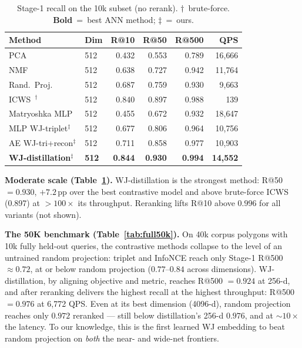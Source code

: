 \documentclass[sigconf]{acmart}
\begin{document}
\begin{table}[t]\centering
\caption{Stage-1 recall on the 10k subset (no rerank). $\dagger$~brute-force.
\textbf{Bold}~=~best ANN method; $\ddagger$~=~ours.}
\label{tab:results}\setlength{\tabcolsep}{4pt}\small
\begin{tabular}{@{}llrrrr@{}}
\toprule
Method & Dim & R@10 & R@50 & R@500 & QPS \\
\midrule
PCA~\cite{jolliffe02}                   & 512  & 0.432 & 0.553 & 0.789 & 16{,}666 \\
NMF~\cite{nmf99}                        & 512  & 0.638 & 0.727 & 0.942 & 11{,}764 \\
Rand.\ Proj.~\cite{achlioptas03}        & 512  & 0.687 & 0.759 & 0.930 &  9{,}663 \\
ICWS~\cite{ioffe10}$^\dagger$           & 512  & 0.840 & 0.897 & 0.988 &     139 \\
Matryoshka MLP~\cite{matryoshka22}      & 512  & 0.455 & 0.672 & 0.932 & 18{,}647 \\
\addlinespace[2pt]
MLP WJ-triplet$^\ddagger$               & 512  & 0.677 & 0.806 & 0.964 & 10{,}756 \\
AE WJ-tri+recon$^\ddagger$              & 512  & 0.711 & 0.858 & 0.977 & 10{,}903 \\
\textbf{WJ-distillation}$^\ddagger$ & \textbf{512} & \textbf{0.844} & \textbf{0.930} & \textbf{0.994} & \textbf{14{,}552} \\
\bottomrule
\end{tabular}
\end{table}

\textbf{Moderate scale (Table~\ref{tab:results}).}
WJ-distillation is the strongest method: R@50 $=0.930$, $+7.2$\,pp over the best
contrastive model and above brute-force ICWS (0.897) at ${>}100\times$ its
throughput. Reranking lifts R@10 above $0.996$ for all variants (not shown).

\textbf{The 50K benchmark (Table~\ref{tab:full50k}).}
On 40k corpus polygons with 10k fully held-out queries, the contrastive methods
collapse to the level of an untrained random projection: triplet and InfoNCE reach
only Stage-1 R@500 $\approx 0.72$, at or below random projection ($0.77$--$0.84$
across dimensions). WJ-distillation, by aligning objective and metric, reaches
R@500 $=0.924$ at 256-d, and after reranking delivers the highest recall at the
highest throughput: R@500 $=0.976$ at 6{,}772 QPS. Even at its best dimension
(4096-d), random projection reaches only $0.972$ reranked --- still below
distillation's 256-d $0.976$, and at ${\sim}10\times$ the latency. To our knowledge,
this is the first learned WJ embedding to beat random projection on \emph{both} the
near- and wide-net frontiers.
\end{document}
